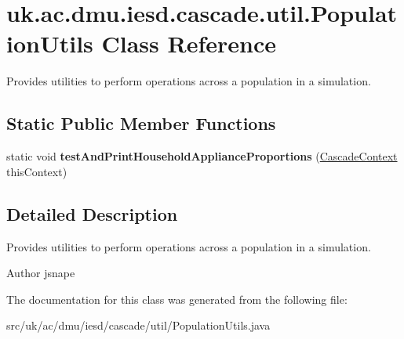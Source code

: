 \hypertarget{classuk_1_1ac_1_1dmu_1_1iesd_1_1cascade_1_1util_1_1_population_utils}{\section{uk.\-ac.\-dmu.\-iesd.\-cascade.\-util.\-Population\-Utils Class Reference}
\label{classuk_1_1ac_1_1dmu_1_1iesd_1_1cascade_1_1util_1_1_population_utils}
}


Provides utilities to perform operations across a population in a simulation.  


\subsection*{Static Public Member Functions}
\begin{DoxyCompactItemize}
\item 
\hypertarget{classuk_1_1ac_1_1dmu_1_1iesd_1_1cascade_1_1util_1_1_population_utils_afdf74d9c6296333dca0bf74c0b8a0dd4}{static void {\bfseries test\-And\-Print\-Household\-Appliance\-Proportions} (\hyperlink{classuk_1_1ac_1_1dmu_1_1iesd_1_1cascade_1_1context_1_1_cascade_context}{Cascade\-Context} this\-Context)}\label{classuk_1_1ac_1_1dmu_1_1iesd_1_1cascade_1_1util_1_1_population_utils_afdf74d9c6296333dca0bf74c0b8a0dd4}

\end{DoxyCompactItemize}


\subsection{Detailed Description}
Provides utilities to perform operations across a population in a simulation. 

\begin{DoxyAuthor}{Author}
jsnape 
\end{DoxyAuthor}


The documentation for this class was generated from the following file\-:\begin{DoxyCompactItemize}
\item 
src/uk/ac/dmu/iesd/cascade/util/Population\-Utils.\-java\end{DoxyCompactItemize}

